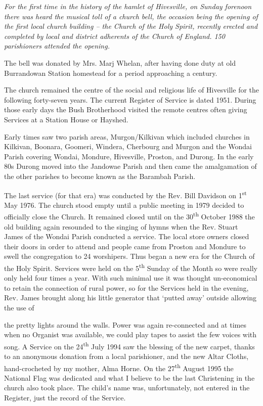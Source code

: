 \emph{For the first time in the history of the hamlet of Hivesville, on Sunday forenoon there was heard the musical toll of a church bell, the occasion being the opening of the first local church building -- the Church of the Holy Spirit, recently erected and completed by local and district adherents of the Church of England. 150 parishioners attended the opening.}



The bell was donated by Mrs. Marj Whelan, after having done duty at old Burrandowan Station homestead for a period approaching a century.



The church remained the centre of the social and religious life of Hivesville for the following forty-seven years. The current Register of Service is dated 1951. During those early days the Bush Brotherhood visited the remote centres often giving Services at a Station House or Hayshed.



Early times saw two parish areas, Murgon/Kilkivan which included churches in Kilkivan, Boonara, Goomeri, Windera, Cherbourg and Murgon and the Wondai Parish covering Wondai, Mondure, Hivesville, Proston, and Durong. In the early 80s Durong moved into the Jandowae Parish and then came the amalgamation of the other parishes to become known as the Barambah Parish.



The last service (for that era) was conducted by the Rev. Bill Davidson on 1\textsuperscript{st} May 1976. The church stood empty until a public meeting in 1979 decided to officially close the Church. It remained closed until on the 30\textsuperscript{th} October 1988 the old building again resounded to the singing of hymns when the Rev. Stuart James of the Wondai Parish conducted a service. The local store owners closed their doors in order to attend and people came from Proston and Mondure to swell the congregation to 24 worshipers. Thus began a new era for the Church of the Holy Spirit. Services were held on the 5\textsuperscript{th} Sunday of the Month so were really only held four times a year. With such minimal use it was thought un-economical to retain the connection of rural power, so for the Services held in the evening, Rev. James brought along his little generator that `putted away' outside allowing the use of



the pretty lights around the walls. Power was again re-connected and at times when no Organist was available, we could play tapes to assist the few voices with song. A Service on the 24\textsuperscript{th} July 1994 saw the blessing of the new carpet, thanks to an anonymous donation from a local parishioner, and the new Altar Cloths, hand-crocheted by my mother, Alma Horne. On the 27\textsuperscript{th} August 1995 the National Flag was dedicated and what I believe to be the last Christening in the church also took place. The child's name was, unfortunately, not entered in the Register, just the record of the Service.



